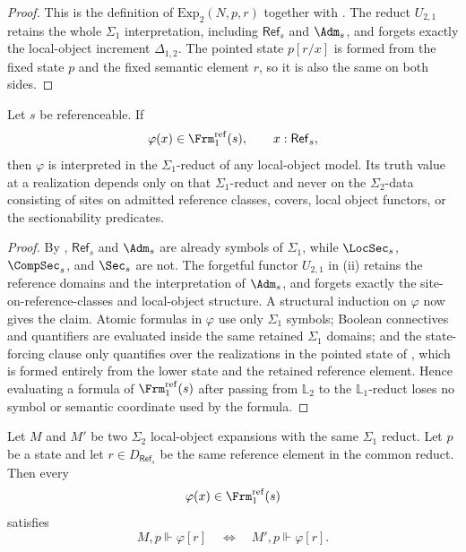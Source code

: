 \begin{proof}
This is the definition of $\mathrm{Exp}_2(N,p,r)$ together with . The reduct $U_{2,1}$ retains the whole $\Sigma_1$ interpretation, including $\mathsf{Ref}_s$ and $\Adm_s$, and forgets exactly the local-object increment $\Delta_{1,2}$. The pointed state $p[r/x]$ is formed from the fixed state $p$ and the fixed semantic element $r$, so it is also the same on both sides.
\end{proof}

\begin{lemma}\label{lem:typed-lower-comparison-formulas}
Let $s$ be referenceable. If
\[
\varphi(x)\in\Frm_1^{\mathrm{ref}}(s),
\qquad
x:\mathsf{Ref}_s,
\]
then $\varphi$ is interpreted in the $\Sigma_1$-reduct of any local-object model. Its truth value at a realization depends only on that $\Sigma_1$-reduct and never on the $\Sigma_2$-data consisting of sites on admitted reference classes, covers, local object functors, or the sectionability predicates.
\end{lemma}

\begin{proof}
By , $\mathsf{Ref}_s$ and $\Adm_s$ are already symbols of $\Sigma_1$, while $\LocSec_s$, $\CompSec_s$, and $\Sec_s$ are not. The forgetful functor $U_{2,1}$ in (ii) retains the reference domains and the interpretation of $\Adm_s$, and forgets exactly the site-on-reference-classes and local-object structure. A structural induction on $\varphi$ now gives the claim. Atomic formulas in $\varphi$ use only $\Sigma_1$ symbols; Boolean connectives and quantifiers are evaluated inside the same retained $\Sigma_1$ domains; and the state-forcing clause only quantifies over the realizations in the pointed state of , which is formed entirely from the lower state and the retained reference element. Hence evaluating a formula of $\Frm_1^{\mathrm{ref}}(s)$ after passing from $\mathbb L_2$ to the $\mathbb L_1$-reduct loses no symbol or semantic coordinate used by the formula.
\end{proof}

\begin{lemma}\label{lem:lower-formula-reduct-invariance}
Let $M$ and $M'$ be two $\Sigma_2$ local-object expansions with the same $\Sigma_1$ reduct. Let $p$ be a state and let $r\in D_{\mathsf{Ref}_s}$ be the same reference element in the common reduct. Then every
\[
\varphi(x)\in\Frm_1^{\mathrm{ref}}(s)
\]
satisfies
\[
M,p\Vdash\varphi[r]
\quad\Longleftrightarrow\quad
M',p\Vdash\varphi[r].
\]
\end{lemma}

